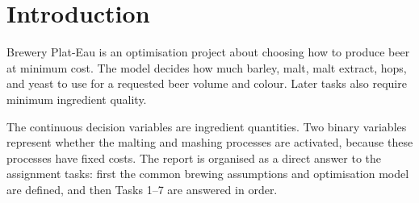 \section{Introduction}
\label{sec:introduction}
Brewery Plat-Eau is an optimisation project about choosing how to produce beer at minimum cost. The model decides how much barley, malt, malt extract, hops, and yeast to use for a requested beer volume and colour. Later tasks also require minimum ingredient quality.

The continuous decision variables are ingredient quantities. Two binary variables represent whether the malting and mashing processes are activated, because these processes have fixed costs. The report is organised as a direct answer to the assignment tasks: first the common brewing assumptions and optimisation model are defined, and then Tasks 1--7 are answered in order.
